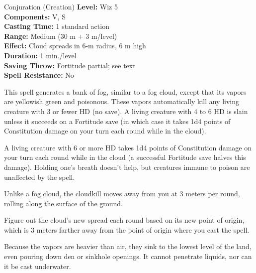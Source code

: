 {Conjuration (Creation)}
{
	\textbf{Level:}
	Wiz 5\\
	\textbf{Components:}
	V, S\\
	\textbf{Casting Time:}
	1 standard action\\
	\textbf{Range:}
	Medium (30 m + 3 m/level)\\
	\textbf{Effect:}
	Cloud spreads in 6-m radius, 6 m high\\
	\textbf{Duration:}
	1 min./level\\
	\textbf{Saving Throw:}
	Fortitude partial; see text\\
	\textbf{Spell Resistance:}
	No\\
}
{
	This spell generates a bank of fog, similar to a fog cloud, except that its vapors are yellowish green and poisonous. These vapors automatically kill any living creature with 3 or fewer HD (no save). A living creature with 4 to 6 HD is slain unless it succeeds on a Fortitude save (in which case it takes 1d4 points of Constitution damage on your turn each round while in the cloud).

	A living creature with 6 or more HD takes 1d4 points of Constitution damage on your turn each round while in the cloud (a successful Fortitude save halves this damage). Holding one's breath doesn't help, but creatures immune to poison are unaffected by the spell.

	Unlike a fog cloud, the cloudkill moves away from you at 3 meters per round, rolling along the surface of the ground.

	Figure out the cloud's new spread each round based on its new point of origin, which is 3 meters farther away from the point of origin where you cast the spell.

	Because the vapors are heavier than air, they sink to the lowest level of the land, even pouring down den or sinkhole openings. It cannot penetrate liquids, nor can it be cast underwater.

}
